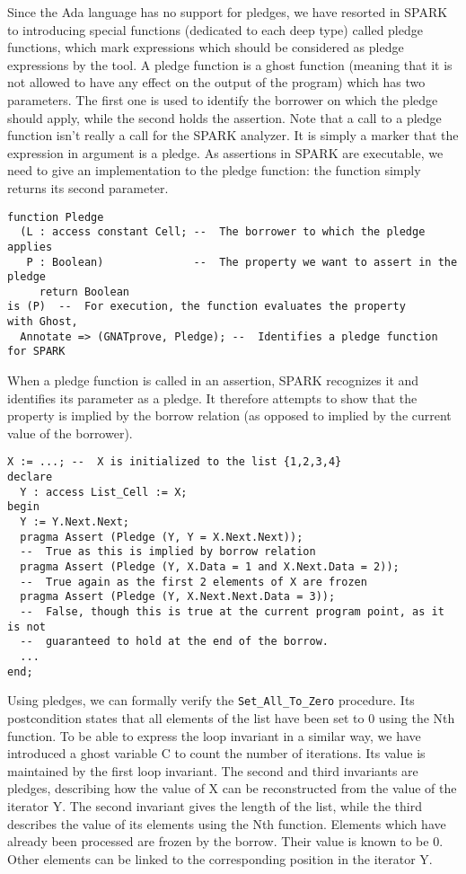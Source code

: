 \documentclass[runningheads]{llncs}
\begin{document}
Since the Ada language has no support for pledges, we have resorted in SPARK to introducing special functions (dedicated to each deep type) called pledge functions, which mark expressions which should be considered as pledge expressions by the tool. A pledge function is a ghost function (meaning that it is not allowed to have any effect on the output of the program) which has two parameters. The first one is used to identify the borrower on which the pledge should apply, while the second holds the assertion.
Note that a call to a pledge function isn't really a call for the SPARK analyzer. It is simply a marker that the expression in argument is a pledge. As assertions in SPARK are executable, we need to give an implementation to the pledge function: the function simply returns its second parameter.
\begin{lstlisting}
function Pledge
  (L : access constant Cell; --  The borrower to which the pledge applies
   P : Boolean)              --  The property we want to assert in the pledge
     return Boolean
is (P)  --  For execution, the function evaluates the property
with Ghost,
  Annotate => (GNATprove, Pledge); --  Identifies a pledge function for SPARK
\end{lstlisting}
When a pledge function is called in an assertion, SPARK recognizes it and identifies its parameter as a pledge. It therefore attempts to show that the property is implied by the borrow relation (as opposed to implied by the current value of the borrower).
\begin{lstlisting}
X := ...; --  X is initialized to the list {1,2,3,4}
declare
  Y : access List_Cell := X;
begin
  Y := Y.Next.Next;
  pragma Assert (Pledge (Y, Y = X.Next.Next));
  --  True as this is implied by borrow relation
  pragma Assert (Pledge (Y, X.Data = 1 and X.Next.Data = 2));
  --  True again as the first 2 elements of X are frozen
  pragma Assert (Pledge (Y, X.Next.Next.Data = 3));
  --  False, though this is true at the current program point, as it is not
  --  guaranteed to hold at the end of the borrow.
  ...
end;
\end{lstlisting}
Using pledges, we can formally verify the \texttt{Set\_All\_To\_Zero} procedure. Its postcondition states that all elements of the list have been set to 0 using the Nth function. To be able to express the loop invariant in a similar way, we have introduced a ghost variable C to count the number of iterations. Its value is maintained by the first loop invariant. The second and third invariants are pledges, describing how the value of X can be reconstructed from the value of the iterator Y. The second invariant gives the length of the list, while the third describes the value of its elements using the Nth function. Elements which have already been processed are frozen by the borrow. Their value is known to be 0. Other elements can be linked to the corresponding position in the iterator Y.
\end{document}
